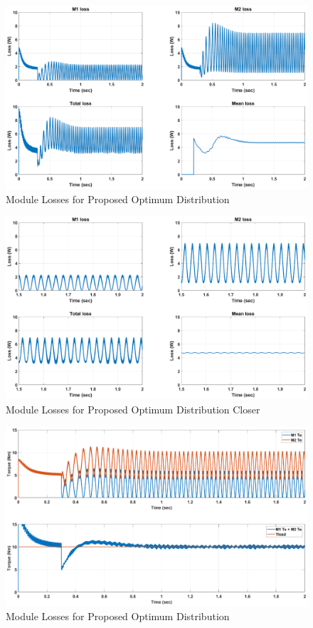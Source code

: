 \documentclass{article}
\begin{document}
\begin{figure}[H]
\centering
\includegraphics[scale=0.35]{SimulationResults/ProposedOptimum/Loss.eps}
\caption{Module Losses for Proposed Optimum Distribution}
\label{fig:LossProposedOptimum}
\end{figure}

\begin{figure}[H]
\centering
\includegraphics[scale=0.35]{SimulationResults/ProposedOptimum/Loss_closer.eps}
\caption{Module Losses for Proposed Optimum Distribution Closer}
\label{fig:LossProposedOptimumCloser}
\end{figure}

\begin{figure}[H]
\centering
\includegraphics[scale=0.35]{SimulationResults/ProposedOptimum/Torques.eps}
\caption{Module Losses for Proposed Optimum Distribution}
\label{fig:LossProposedOptimum}
\end{figure}
\end{document}
